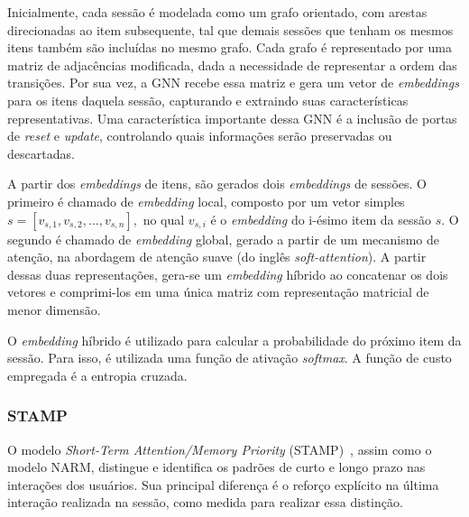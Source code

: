 Inicialmente, cada sessão é modelada como um grafo orientado, com arestas
direcionadas ao item subsequente, tal que demais sessões que tenham os mesmos
itens também são incluídas no mesmo grafo. Cada grafo é representado por uma
matriz de adjacências modificada, dada a necessidade de representar a ordem das
transições. Por sua vez, a GNN recebe essa matriz e gera um vetor de
\textit{embeddings} para os itens daquela sessão, capturando e extraindo suas
características representativas. Uma característica importante dessa GNN é a inclusão
de portas de \textit{reset} e \textit{update}, controlando quais informações
serão preservadas ou descartadas.

A partir dos \textit{embeddings} de itens, são gerados dois \textit{embeddings}
de sessões. O primeiro é chamado de \textit{embedding} local, composto por um
vetor simples $s = [v_{s,1}, v_{s,2}, \ldots, v_{s,n}],$ no qual $v_{s,i}$ é o
\textit{embedding} do i-ésimo item da sessão $s$. O segundo é chamado de
\textit{embedding} global, gerado a partir de um mecanismo de atenção, na
abordagem de atenção suave (do inglês \textit{soft-attention}). A partir dessas
duas representações, gera-se um \textit{embedding} híbrido ao concatenar os dois
vetores e comprimi-los em uma única matriz com representação matricial de menor
dimensão.

O \textit{embedding} híbrido é utilizado para calcular a probabilidade do próximo item
da sessão. Para isso, é utilizada uma função de ativação \textit{softmax}. A função de custo
empregada é a entropia cruzada.

\subsubsection{STAMP}
O modelo \textit{Short-Term Attention/Memory Priority} (STAMP)~\cite{stamp}, assim como o
modelo NARM, distingue e identifica os padrões de curto e longo prazo
nas interações dos usuários. Sua principal diferença é o reforço explícito na
última interação realizada na sessão, como medida para realizar essa distinção.

